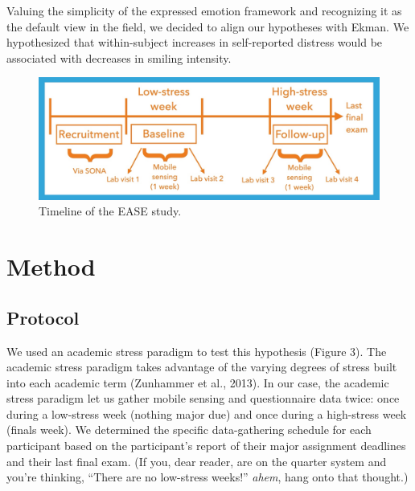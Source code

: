 \documentclass[authordate, empirical]{jote-new-article}
\begin{document}
Valuing the simplicity of the expressed emotion framework and recognizing it as the default view in the field, we decided to align our hypotheses with Ekman. We hypothesized that within-subject increases in self-reported distress would be associated with decreases in smiling intensity.












\begin{figure}[t]
  \begin{fullwidth}
    \includegraphics[width=\linewidth]{media/image3.jpeg}

    \caption{Timeline of the EASE study.}
  \end{fullwidth}

  \label{fig:rId10}


\end{figure}





\section{Method}







\subsection{Protocol}



We used an academic stress paradigm to test this hypothesis (Figure 3). The academic stress paradigm takes advantage of the varying degrees of stress built into each academic term (Zunhammer et al., 2013). In our case, the academic stress paradigm let us gather mobile sensing and questionnaire data twice: once during a low-stress week (nothing major due) and once during a high-stress week (finals week). We determined the specific data-gathering schedule for each participant based on the participant's report of their major assignment deadlines and their last final exam. (If you, dear reader, are on the quarter system and you're thinking, “There are no low-stress weeks!” \emph{ahem}, hang onto that thought.)
\end{document}
